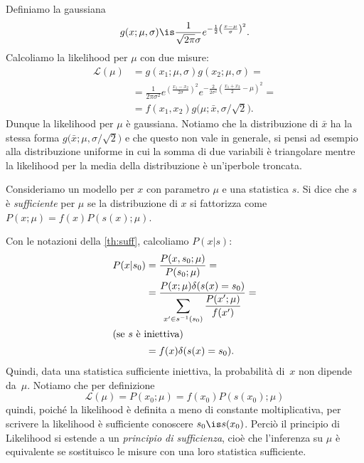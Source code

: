 
Definiamo la gaussiana
\begin{equation*}
	g(x;\mu,\sigma) \is \frac1{\sqrt{2\pi}\sigma} e^{-\frac12 \left( \frac{x-\mu}\sigma \right)^2}.
\end{equation*}
Calcoliamo la likelihood per $\mu$ con due misure:
\begin{align*}
	\mathcal L(\mu)
	&= g(x_1;\mu,\sigma) g(x_2;\mu,\sigma) = \\
	&= \frac1{2\pi\sigma^2}
	e^{\left( \frac{x_1-x_2}{2\sigma} \right)^2}
	e^{-\frac2{2\sigma^2} \left( \frac{x_1+x_2}2 - \mu \right)^2} = \\
	&= f(x_1,x_2) g \big( \mu;\bar x,\sigma/\sqrt2 \big).
\end{align*}
Dunque la likelihood per $\mu$ è gaussiana.
Notiamo che la distribuzione di $\bar x$ ha la stessa forma $g \big( \bar x;\mu,\sigma/\sqrt2 \big)$
e che questo non vale in generale, si pensi ad esempio alla distribuzione uniforme
in cui la somma di due variabili è triangolare mentre la likelihood per la media della distribuzione è un'iperbole troncata.

\begin{definition}[Sufficienza]
	\label{th:suff}
	Consideriamo un modello per $x$ con parametro $\mu$ e una statistica $s$.
	Si dice che $s$ è \emph{sufficiente} per $\mu$ se la distribuzione di $x$ si fattorizza come
	$P(x;\mu) = f(x) P(s(x);\mu)$.
\end{definition}

Con le notazioni della \autoref{th:suff}, calcoliamo $P(x|s)$:
\begin{align*}
	P(x|s_0)
	&= \frac{P(x,s_0;\mu)}{P(s_0;\mu)} = \\
	&= \frac{P(x;\mu) \delta(s(x)=s_0)}{\displaystyle \sum_{x'\in s^{-1}(s_0)} \frac{P(x';\mu)}{f(x')}} = \\
	\intertext{(se $s$ è iniettiva)}
	&= f(x) \delta(s(x)=s_0).
\end{align*}
Quindi, data una statistica sufficiente iniettiva, la probabilità di~$x$ non dipende da~$\mu$.
Notiamo che per definizione
\begin{equation*}
	\mathcal L(\mu) = P(x_0;\mu) = f(x_0) P(s(x_0);\mu)
\end{equation*}
quindi, poiché la likelihood è definita a meno di constante moltiplicativa,
per scrivere la likelihood è sufficiente conoscere $s_0 \is s(x_0)$.
Perciò il principio di Likelihood si estende a un \emph{principio di sufficienza},
cioè che l'inferenza su $\mu$ è equivalente se sostituisco le misure con una loro statistica sufficiente.

